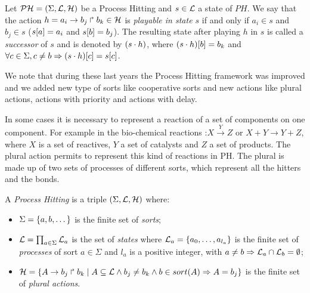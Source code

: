 \begin{definition} 
\label{def:playableAction}
Let $\mathcal{PH} = (\Sigma,\mathcal{L},\mathcal{H})$ be a Process Hitting and $s \in \mathcal{L}$ a state of $PH$.
We say that the action $h = a_i\rightarrow b_j\Rsh b_k \in \mathcal{H}$
is \emph{playable in state $s$} if and only if
$a_i \in s$ and $b_j \in s$ (\ie ${s[a]} = a_i$ and ${s[b]}=b_j$).
The resulting state after playing $h$ in $s$
is called a \emph{successor} of $s$ and
is denoted by $(s \cdot h)$,
where ${(s \cdot h)[b]} = b_k$ and
$\forall c \in \Sigma, c \neq b \Rightarrow {(s \cdot h)[c]}={s[c]}$.
\end{definition}

We note that during these last years the Process Hitting framework was improved and we added new type of sorts like cooperative sorts and new actions like plural actions, actions with priority and actions with delay.

In some cases it is necessary to represent a reaction of a set of components on one component. For example in the bio-chemical reactions :$X \xrightarrow{Y} Z$ or  $X + Y \rightarrow Y + Z$, where $ X $ is a set of reactives, $ Y $ a set of catalysts and $ Z $ a set of products.%
The plural action permits to represent this kind of reactions in PH. The plural is made up of two sets of processes of different sorts, which represent all the hitters and the bonds.

\begin{definition}\label{def:PH}
  A \emph{Process Hitting} is a triple $(\Sigma,\mathcal{L},\mathcal{H})$ where:
  \begin{itemize}
    \item  $\Sigma = \{a,b,\dots\}$ is the finite set of \emph{sorts};
    \item  $\mathcal{L} = \prod_{a\in\Sigma} \mathcal{L}_a$ is the set of \emph{states} where
      $\mathcal{L}_a = \{a_0,\dots,a_{l_a}\}$
      is the finite set of \emph{processes} of sort $a\in\Sigma$
      and $l_a$ is a positive integer, with $a\neq b\Rightarrow \mathcal{L}_a \cap \mathcal{L}_b = \emptyset$;
    \item  $\mathcal{H} = \{ A\rightarrow b_j\Rsh b_k  \mid A \subseteq \mathcal{L} \wedge b_j\neq b_k \wedge b \in sort(A) \Rightarrow A=b_j\}$
      is the finite set of \emph{plural actions}.
  \end{itemize}
\end{definition}



